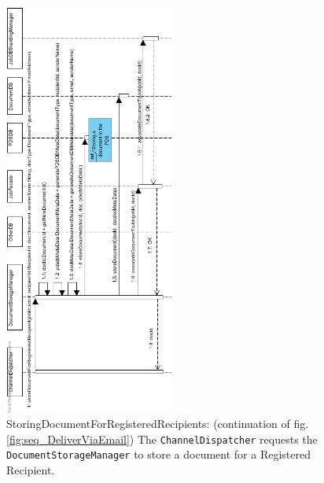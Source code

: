 \documentclass[a4paper,10pt]{article}
\begin{document}
\begin{figure}[!htp]
    \centering
    \includegraphics[width=0.5\textwidth]{StoringDocumentForRegisteredRecipients.png}
    \caption{StoringDocumentForRegisteredRecipients: (continuation of fig. \ref{fig:seq_DeliverViaEmail}) The \texttt{ChannelDispatcher} requests the \texttt{DocumentStorageManager} to store a document for a Registered Recipient.
        }\label{fig:seq_StoringDocumentForRegisteredRecipients}
\end{figure}
\end{document}
